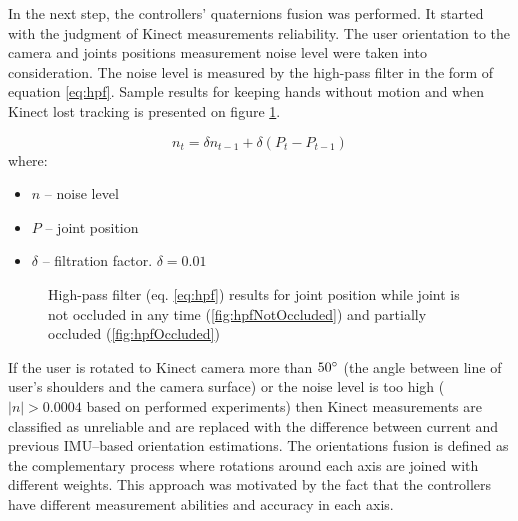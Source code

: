 \documentclass[9pt]{llncs}
\begin{document}
In the next step, the controllers' quaternions fusion was performed. It started with the judgment of Kinect measurements reliability. The user orientation to the camera and joints positions measurement noise level were taken into consideration. The noise level is measured by the high-pass filter in the form of equation \ref{eq:hpf}. Sample results for keeping hands without motion and when Kinect lost tracking is presented on figure \ref{fig:hpfResults}.

\begin{equation}
	\label{eq:hpf}
	n_t = \delta n_{t-1} + \delta(P_t - P_{t-1}) 
\end{equation}\cite{HPFWiki}
where:
\begin{itemize}
	\item $n$ -- noise level
	\item $P$ -- joint position
	\item $\delta$ -- filtration factor. $\delta = 0.01$
\end{itemize}

\begin{figure}[!htb]
	\centering 
	\caption{High-pass filter (eq. \ref{eq:hpf}) results for joint position while joint is not occluded in any time (\ref{fig:hpfNotOccluded}) and partially occluded (\ref{fig:hpfOccluded})}
	\label{fig:hpfResults}
\end{figure}

If the user is rotated to Kinect camera more than $50\degree$ (the angle between line of user's shoulders and the camera surface) or the noise level is too high ($ |n| > 0.0004$ based on performed experiments) then Kinect measurements are classified as unreliable and are replaced with the difference between current and previous IMU--based orientation estimations. The orientations fusion is defined as the complementary process where rotations around each axis are joined with different weights. This approach was motivated by the fact that the controllers have different measurement abilities and accuracy in each axis.
\end{document}
